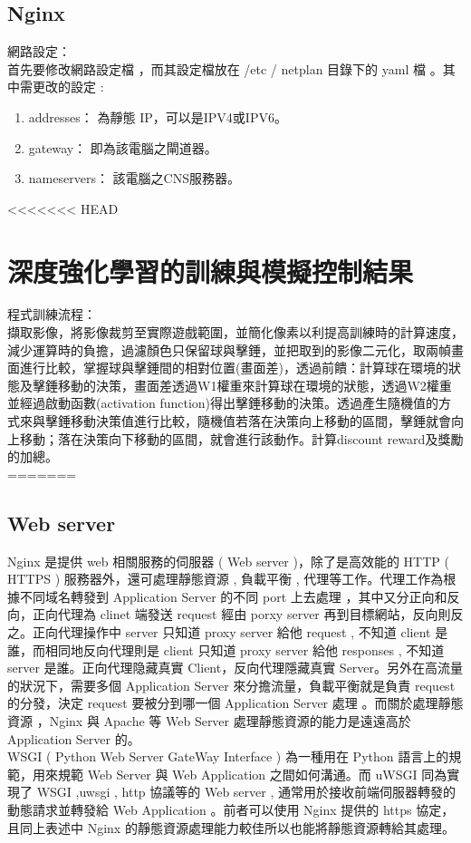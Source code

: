 \documentclass[14pt,a4paper]{report}  %
\begin{document}
\section{Nginx}
 網路設定：\\
 首先要修改網路設定檔 ，而其設定檔放在 /etc / netplan 目錄下的 yaml 檔 。其中需更改的設定 :
\begin{enumerate}
\item addresses： 為靜態 IP，可以是IPV4或IPV6。
\item gateway： 即為該電腦之閘道器。
\item nameservers： 該電腦之CNS服務器。
\end{enumerate}
<<<<<<< HEAD
\newpage
\chapter{深度強化學習的訓練與模擬控制結果}
程式訓練流程：\\
 擷取影像，將影像裁剪至實際遊戲範圍，並簡化像素以利提高訓練時的計算速度，減少運算時的負擔，過濾顏色只保留球與擊錘，並把取到的影像二元化，取兩幀畫面進行比較，掌握球與擊錘間的相對位置(畫面差)，透過前饋：計算球在環境的狀態及擊錘移動的決策，畫面差透過W1權重來計算球在環境的狀態，透過W2權重並經過啟動函數(activation function)得出擊錘移動的決策。透過產生隨機值的方式來與擊錘移動決策值進行比較，隨機值若落在決策向上移動的區間，擊錘就會向上移動；落在決策向下移動的區間，就會進行該動作。計算discount reward及獎勵的加總。\\
=======
\section{Web server}
\qquad Nginx 是提供 web 相關服務的伺服器 ( Web server )，除了是高效能的 HTTP ( HTTPS ) 服務器外，還可處理靜態資源 , 負載平衡 , 代理等工作。代理工作為根據不同域名轉發到 Application Server 的不同 port 上去處理 ，其中又分正向和反向，正向代理為 clinet 端發送 request 經由 porxy server 再到目標網站，反向則反之。正向代理操作中 server 只知道 proxy server  給他 request , 不知道 client 是誰，而相同地反向代理則是 client 只知道 proxy server 給他 responses , 不知道 server 是誰。正向代理隐藏真實 Client，反向代理隱藏真實 Server。另外在高流量的狀況下，需要多個 Application Server 來分擔流量，負載平衡就是負責 request 的分發，決定 request 要被分到哪一個 Application Server 處理 。而關於處理靜態資源 ，Nginx 與 Apache 等 Web Server 處理靜態資源的能力是遠遠高於 Application Server 的。\\
\qquad WSGI ( Python Web Server GateWay Interface ) 為一種用在 Python 語言上的規範，用來規範 Web Server 與 Web Application 之間如何溝通。而 uWSGI 同為實現了 WSGI ,uwsgi , http 協議等的 Web server , 通常用於接收前端伺服器轉發的動態請求並轉發給 Web Application 。前者可以使用 Nginx 提供的 https 協定，且同上表述中 Nginx 的靜態資源處理能力較佳所以也能將靜態資源轉給其處理。\\
\newpage
\end{document}

